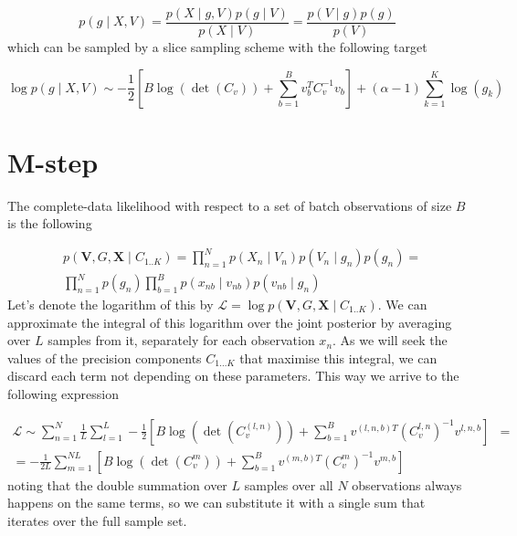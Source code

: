 \documentclass{paper}
\begin{document}
\begin{equation} 
p(g \mid X,V) = \frac{p(X \mid g,V) p(g \mid V)}{p(X \mid V)} = \frac{p(V \mid g) p(g)}{p(V)}
\end{equation}
%
which can be sampled by a  slice sampling scheme with the following target

\begin{equation} \label{eq:g_cond_logpost}
\log p(g \mid X,V) \sim -\frac{1}{2} \left[B\log(\det(C_v)) + \sum_{b=1}^B v_b^T C_v^{-1} v_b\right] + (\alpha-1) \sum_{k=1}^K \log(g_k)
\end{equation}


\section{M-step}

The complete-data likelihood with respect to a set of batch observations of size $B$ is the following

\begin{equation}
\begin{split}
&p(\mathbf{V},G,\mathbf{X} \mid C_{1..K}) = \prod_{n=1}^N p(X_n \mid V_n) p(V_n \mid g_n) p(g_n) = \\
&\prod_{n=1}^N p(g_n) \prod_{b=1}^B p(x_{nb} \mid v_{nb}) p(v_{nb} \mid g_n) 
\end{split}
\end{equation}
%
Let's denote the logarithm of this by $\mathcal{L}=\log p(\mathbf{V},G,\mathbf{X} \mid C_{1..K})$. We can approximate the integral of this logarithm over the joint posterior by averaging over $L$ samples from it, separately for each observation $x_n$. As we will seek the values of the precision components $C_{1 \dots K}$ that maximise this integral, we can discard each term not depending on these parameters. This way we arrive to the following expression 

\begin{equation}
\begin{split}
\mathcal{L} \sim \sum_{n=1}^N \frac{1}{L} \sum_{l=1}^L -\frac{1}{2} \left[B \log \left( \det \left( C_v^{(l,n)} \right) \right) + \sum_{b=1}^B v^{(l,n,b)T}  \left( C_v^{l,n} \right)^{-1} v^{l,n,b}\right]& = \\
= -\frac{1}{2L} \sum_{m=1}^{NL} \left[B \log \left( \det \left( C_v^{m} \right) \right) + \sum_{b=1}^B v^{(m,b)T}  \left( C_v^{m} \right)^{-1} v^{m,b}\right]&
\end{split}
\end{equation}
%
noting that the double summation over $L$ samples over all $N$ observations always happens on the same terms, so we can substitute it with a single sum that iterates over the full sample set.
\end{document}
